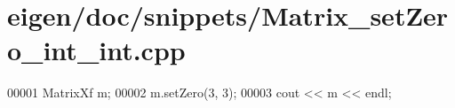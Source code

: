 \hypertarget{eigen_2doc_2snippets_2_matrix__set_zero__int__int_8cpp_source}{}\section{eigen/doc/snippets/\+Matrix\+\_\+set\+Zero\+\_\+int\+\_\+int.cpp}
\label{eigen_2doc_2snippets_2_matrix__set_zero__int__int_8cpp_source}

\begin{DoxyCode}
00001 MatrixXf m;
00002 m.setZero(3, 3);
00003 cout << m << endl;
\end{DoxyCode}
